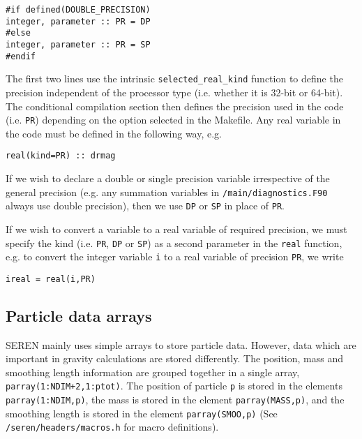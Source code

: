 \documentclass[a4paper]{article}
\newcommand{\NAME}{SEREN }
\newcommand{\name}{seren}
\newcommand{\var}[1]{\texttt{#1}}
\begin{document}
\noindent \var{\#if defined(DOUBLE\_PRECISION)} \\
\indent \var{integer, parameter :: PR = DP} \\
\noindent \var{\#else}\\
\indent \var{integer, parameter :: PR = SP} \\
\noindent \var{\#endif}\newline


\noindent The first two lines use the intrinsic \var{selected\_real\_kind} function to define the precision independent of the processor type (i.e. whether it is 32-bit or 64-bit).  The conditional compilation section then defines the precision used in the code (i.e. \var{PR}) depending on the option selected in the Makefile.  Any real variable in the code must be defined in the following way, e.g. \newline

\indent \var{real(kind=PR) :: drmag} \newline

\noindent If we wish to declare a double or single precision variable irrespective of the general precision (e.g. any summation variables in \var{/main/diagnostics.F90} always use double precision), then we use \var{DP} or \var{SP} in place of \var{PR}. 

If we wish to convert a variable to a real variable of required precision, we must specify the kind (i.e. \var{PR}, \var{DP} or \var{SP}) as a second parameter in the \var{real} function, e.g. to convert the integer variable \var{i} to a real variable of precision \var{PR}, we write \newline

\indent \var{ireal = real(i,PR)} \\


\subsection{Particle data arrays} \label{SS:DATA}
\NAME mainly uses simple arrays to store particle data.  However, data which are important in gravity calculations are stored differently.  The position, mass and smoothing length information are grouped together in a single array, \var{parray(1:NDIM+2,1:ptot)}.  The position of particle \var{p} is stored in the elements \var{parray(1:NDIM,p)}, the mass is stored in the element \var{parray(MASS,p)}, and the smoothing length is stored in the element \var{parray(SMOO,p)} (See \var{/\name/headers/macros.h} for macro definitions). \newline
\end{document}
